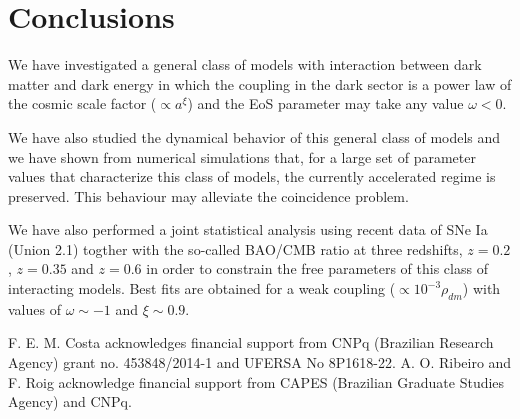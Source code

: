 \documentclass[twocolumn,preprintnumbers,amsmath,amssymb]{revtex4}
\begin{document}
\section{Conclusions}

We have investigated a general class of models with interaction between dark matter and dark energy 
in which the coupling in the dark sector is a power law of the cosmic scale factor ($\propto a^{\xi}$) 
and the EoS parameter may take any value $\omega < 0$.

We have also studied the dynamical behavior of this general class of models and we have shown from numerical 
simulations that, for a large set of parameter values ​​that characterize this class of models, the currently accelerated 
regime is preserved. This behaviour may alleviate the coincidence problem. 

We have also performed a joint statistical analysis using recent data of SNe Ia (Union 2.1) togther with 
the so-called BAO/CMB ratio at three redshifts, $z = 0.2$, $z = 0.35$ and $z = 0.6$ in order to constrain 
the free parameters of this class of interacting models. Best fits are obtained for a weak coupling 
($\propto 10^{-3}\rho_{dm}$) with values of $\omega \sim -1$ and $\xi \sim 0.9$.


\begin{acknowledgments}

F. E. M. Costa acknowledges financial support from CNPq (Brazilian Research Agency) grant no. 453848/2014-1 and UFERSA No 8P1618-22. A. O. Ribeiro 
and F. Roig acknowledge financial support from CAPES (Brazilian Graduate Studies Agency) and CNPq.

\end{acknowledgments}

\end{document}
